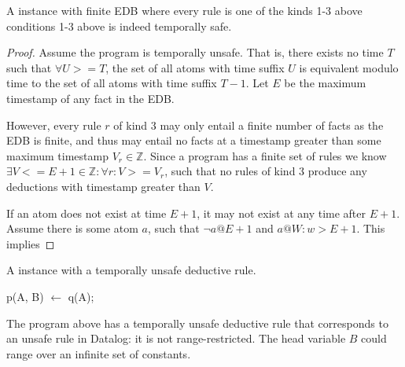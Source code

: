 \begin{lemma} 
%
A \slang instance with finite EDB where every rule is one of the kinds 1-3
above conditions 1-3 above is indeed temporally safe.
%
\end{lemma}
%
\begin{proof}
%
Assume the program is temporally unsafe.  That is, there exists no time $T$
such that $\forall U >= T$, the set of all atoms with time suffix $U$ is
equivalent modulo time to the set of all atoms with time suffix $T-1$.  Let $E$
be the maximum timestamp of any fact in the EDB.

However, every rule $r$ of kind 3 may only entail a finite number of facts as
the EDB is finite, and thus may entail no facts at a timestamp greater than
some maximum timestamp $V_r \in \mathbb{Z}$.  Since a \slang program has a
finite set of rules we know $\exists V <= E+1 \in \mathbb{Z} : \forall r: V >= V_r$,
such that no rules of kind 3 produce any deductions with timestamp greater than
$V$.

If an atom does not exist at time $E+1$, it may not exist at any time after $E+1$.
Assume there is some atom $a$, such that $\lnot a@E+1$ and $a@W : w>E+1$.  This
implies 

%
\end{proof}

\begin{example}
A \slang instance with a temporally unsafe deductive rule.

\begin{Dedalus}
p(A, B) \(\leftarrow\) q(A);
\end{Dedalus}

The program above has a temporally unsafe deductive rule that corresponds to an
unsafe rule in Datalog: it is not range-restricted.  The head variable $B$
could range over an infinite set of constants.
\end{example}


